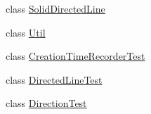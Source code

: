 \begin{DoxyCompactItemize}
class \hyperlink{classorg_1_1tzi_1_1use_1_1gui_1_1views_1_1diagrams_1_1util_1_1_solid_directed_line}{Solid\-Directed\-Line}
\item 
class \hyperlink{classorg_1_1tzi_1_1use_1_1gui_1_1views_1_1diagrams_1_1util_1_1_util}{Util}
\item 
class \hyperlink{classorg_1_1tzi_1_1use_1_1gui_1_1views_1_1diagrams_1_1util_1_1_creation_time_recorder_test}{Creation\-Time\-Recorder\-Test}
\item 
class \hyperlink{classorg_1_1tzi_1_1use_1_1gui_1_1views_1_1diagrams_1_1util_1_1_directed_line_test}{Directed\-Line\-Test}
\item 
class \hyperlink{classorg_1_1tzi_1_1use_1_1gui_1_1views_1_1diagrams_1_1util_1_1_direction_test}{Direction\-Test}
\end{DoxyCompactItemize}
